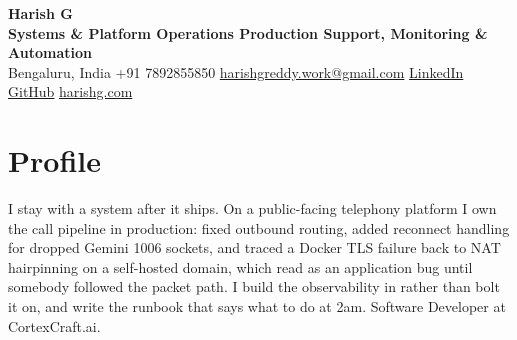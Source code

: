 \documentclass[10pt,a4paper]{article}
\begin{document}
{\LARGE\bfseries Harish G}\\[1pt]
{\normalsize\bfseries Systems \& Platform Operations \textbar{} Production Support, Monitoring \& Automation}\\[2pt]
{\small Bengaluru, India \quad\textbar\quad +91 7892855850 \quad\textbar\quad
\href{mailto:harishgreddy.work@gmail.com}{harishgreddy.work@gmail.com} \quad\textbar\quad
\href{https://www.linkedin.com/in/harishgreddy/}{LinkedIn} \quad\textbar\quad
\href{https://github.com/harish00506/}{GitHub} \quad\textbar\quad \href{https://www.harishg.com}{harishg.com}}

\section{Profile}
I stay with a system after it ships. On a public-facing telephony platform I own the call pipeline
in production: fixed outbound routing, added reconnect handling for dropped Gemini 1006 sockets, and
traced a Docker TLS failure back to NAT hairpinning on a self-hosted domain, which read as an
application bug until somebody followed the packet path. I build the observability in rather than bolt
it on, and write the runbook that says what to do at 2am. Software Developer at CortexCraft.ai.

\end{document}
